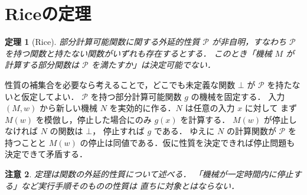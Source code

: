 \documentclass[a5paper,10pt,onecolumn]{jsarticle}
\makeatletter
\theoremstyle{mathnotetheorem}
\newtheorem{theorem}{定理}[section]
\newtheorem{remark}[theorem]{注意}
\renewcommand{\proofname}{証明}
\renewenvironment{proof}[1][\proofname]{%
  \par\pushQED{\qed}\normalfont\topsep4\p@\@plus2\p@\relax
  \trivlist\item[\hskip\labelsep\bfseries #1]\ignorespaces
}{\popQED\endtrivlist\@endpefalse}
\makeatother
\begin{document}
\section{Riceの定理}
\begin{theorem}[Rice]
部分計算可能関数に関する外延的性質 $\mathcal P$ が非自明，すなわち
$\mathcal P$ を持つ関数と持たない関数がいずれも存在するとする．
このとき「機械 $M$ が計算する部分関数は $\mathcal P$ を満たすか」は決定可能でない．
\end{theorem}
\begin{proof}
性質の補集合を必要なら考えることで，どこでも未定義な関数
$\bot$ が $\mathcal P$ を持たないと仮定してよい．
$\mathcal P$ を持つ部分計算可能関数 $g$ の機械を固定する．
入力 $(M,w)$ から新しい機械 $N$ を実効的に作る．$N$ は任意の入力 $x$ に対して
まず $M(w)$ を模倣し，停止した場合にのみ $g(x)$ を計算する．
$M(w)$ が停止しなければ $N$ の関数は $\bot$，
停止すれば $g$ である．
ゆえに $N$ の計算関数が $\mathcal P$ を持つことと
$M(w)$ の停止は同値である．仮に性質を決定できれば停止問題も決定できて矛盾する．
\end{proof}
\begin{remark}
定理は関数の外延的性質について述べる．
「機械が一定時間内に停止する」など実行手順そのものの性質は
直ちに対象とはならない．
\end{remark}
\end{document}
